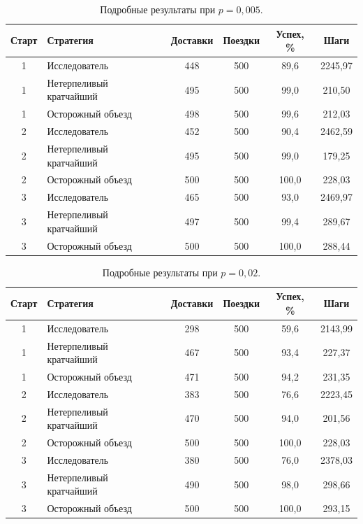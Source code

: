 \documentclass[12pt,a4paper]{article}
\begin{document}
\begin{table}[H]
\centering
\footnotesize
\caption{Подробные результаты при $p=0,005$.}
\begin{tabular}{|c|p{4.6cm}|c|c|c|c|}
\hline
Старт & Стратегия & Доставки & Поездки & Успех, \% & Шаги \\ \hline
1 & Исследователь & 448 & 500 & 89,6 & 2245,97 \\ \hline
1 & Нетерпеливый кратчайший & 495 & 500 & 99,0 & 210,50 \\ \hline
1 & Осторожный объезд & 498 & 500 & 99,6 & 212,03 \\ \hline
2 & Исследователь & 452 & 500 & 90,4 & 2462,59 \\ \hline
2 & Нетерпеливый кратчайший & 495 & 500 & 99,0 & 179,25 \\ \hline
2 & Осторожный объезд & 500 & 500 & 100,0 & 228,03 \\ \hline
3 & Исследователь & 465 & 500 & 93,0 & 2469,97 \\ \hline
3 & Нетерпеливый кратчайший & 497 & 500 & 99,4 & 289,67 \\ \hline
3 & Осторожный объезд & 500 & 500 & 100,0 & 288,44 \\ \hline
\end{tabular}
\end{table}

\begin{table}[H]
\centering
\footnotesize
\caption{Подробные результаты при $p=0,02$.}
\begin{tabular}{|c|p{4.6cm}|c|c|c|c|}
\hline
Старт & Стратегия & Доставки & Поездки & Успех, \% & Шаги \\ \hline
1 & Исследователь & 298 & 500 & 59,6 & 2143,99 \\ \hline
1 & Нетерпеливый кратчайший & 467 & 500 & 93,4 & 227,37 \\ \hline
1 & Осторожный объезд & 471 & 500 & 94,2 & 231,35 \\ \hline
2 & Исследователь & 383 & 500 & 76,6 & 2223,45 \\ \hline
2 & Нетерпеливый кратчайший & 470 & 500 & 94,0 & 201,56 \\ \hline
2 & Осторожный объезд & 500 & 500 & 100,0 & 228,03 \\ \hline
3 & Исследователь & 380 & 500 & 76,0 & 2378,03 \\ \hline
3 & Нетерпеливый кратчайший & 490 & 500 & 98,0 & 298,66 \\ \hline
3 & Осторожный объезд & 500 & 500 & 100,0 & 293,15 \\ \hline
\end{tabular}
\end{table}
\end{document}
